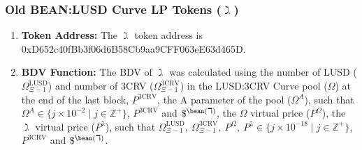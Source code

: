 \documentclass[class=article, crop=false]{standalone}
\begin{document}
    \subsubsection{Old BEAN:LUSD Curve LP Tokens ($\gimel$)}
   \begin{enumerate}
        \item \textbf{Token Address:} The $\gimel$ token address is 0xD652c40fBb3f06d6B58Cb9aa9CFF063eE63d465D.
        \item \textbf{BDV Function:} The BDV of $\gimel$ was calculated using the number of LUSD ($\Omega_{\Xi-1}^{\text{LUSD}}$) and number of 3CRV ($\Omega_{\Xi-1}^{\text{3CRV}}$) in the LUSD:3CRV Curve pool ($\Omega$) at the end of the last block, $P^{\text{3CRV}}$, the A parameter of the pool ($\Omega^{A}$), such that $\Omega^{A} \in \{j \times 10^{-2} \mid j \in \mathbb{Z}^{+} \}$, $P^{\text{3CRV}}$ and $\$^{\bean(\daleth)}$, the $\Omega$ virtual price ($P^{\Omega}$), the $\gimel$ virtual price ($P^{\gimel}$), such that $\Omega_{\Xi-1}^{\text{LUSD}},\ \Omega_{\Xi-1}^{\text{3CRV}},\ P^{\Omega},\ P^{\gimel} \in \{j \times 10^{-18} \mid j \in \mathbb{Z}^{+} \}$, $P^{\text{3CRV}}$ and $\$^{\bean(\daleth)}$. 


\end{enumerate}
\end{document}
